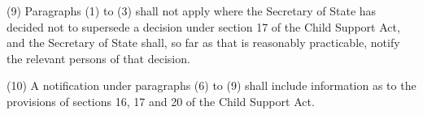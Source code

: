 \documentclass[12pt,a4paper]{article}
\begin{document}
%
%

(9) Paragraphs (1) to (3) shall not apply where the 
Secretary of State  %
has decided not to supersede a decision under section 17 of the Child Support Act, and 
the Secretary of State  %
shall, so far as that is reasonably practicable, notify the relevant persons of that decision.

(10) A notification under paragraphs (6) to (9) shall include information as to the provisions of sections 16, 17 and 20 of the Child Support Act.
\end{document}
